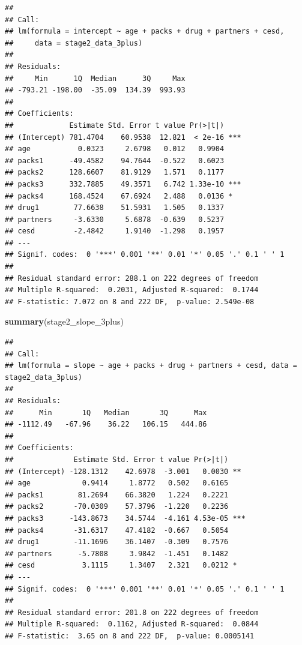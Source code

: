 \documentclass[
]{article}
\newenvironment{Shaded}{\begin{snugshade}}{\end{snugshade}}
\newcommand{\FunctionTok}[1]{\textcolor[rgb]{0.13,0.29,0.53}{\textbf{#1}}}
\newcommand{\NormalTok}[1]{#1}
\begin{document}
\begin{verbatim}
## 
## Call:
## lm(formula = intercept ~ age + packs + drug + partners + cesd, 
##     data = stage2_data_3plus)
## 
## Residuals:
##     Min      1Q  Median      3Q     Max 
## -793.21 -198.00  -35.09  134.39  993.93 
## 
## Coefficients:
##             Estimate Std. Error t value Pr(>|t|)    
## (Intercept) 781.4704    60.9538  12.821  < 2e-16 ***
## age           0.0323     2.6798   0.012   0.9904    
## packs1      -49.4582    94.7644  -0.522   0.6023    
## packs2      128.6607    81.9129   1.571   0.1177    
## packs3      332.7885    49.3571   6.742 1.33e-10 ***
## packs4      168.4524    67.6924   2.488   0.0136 *  
## drug1        77.6638    51.5931   1.505   0.1337    
## partners     -3.6330     5.6878  -0.639   0.5237    
## cesd         -2.4842     1.9140  -1.298   0.1957    
## ---
## Signif. codes:  0 '***' 0.001 '**' 0.01 '*' 0.05 '.' 0.1 ' ' 1
## 
## Residual standard error: 288.1 on 222 degrees of freedom
## Multiple R-squared:  0.2031, Adjusted R-squared:  0.1744 
## F-statistic: 7.072 on 8 and 222 DF,  p-value: 2.549e-08
\end{verbatim}

\begin{Shaded}
\begin{Highlighting}[]
\FunctionTok{summary}\NormalTok{(stage2\_slope\_3plus)}
\end{Highlighting}
\end{Shaded}

\begin{verbatim}
## 
## Call:
## lm(formula = slope ~ age + packs + drug + partners + cesd, data = stage2_data_3plus)
## 
## Residuals:
##      Min       1Q   Median       3Q      Max 
## -1112.49   -67.96    36.22   106.15   444.86 
## 
## Coefficients:
##              Estimate Std. Error t value Pr(>|t|)    
## (Intercept) -128.1312    42.6978  -3.001   0.0030 ** 
## age            0.9414     1.8772   0.502   0.6165    
## packs1        81.2694    66.3820   1.224   0.2221    
## packs2       -70.0309    57.3796  -1.220   0.2236    
## packs3      -143.8673    34.5744  -4.161 4.53e-05 ***
## packs4       -31.6317    47.4182  -0.667   0.5054    
## drug1        -11.1696    36.1407  -0.309   0.7576    
## partners      -5.7808     3.9842  -1.451   0.1482    
## cesd           3.1115     1.3407   2.321   0.0212 *  
## ---
## Signif. codes:  0 '***' 0.001 '**' 0.01 '*' 0.05 '.' 0.1 ' ' 1
## 
## Residual standard error: 201.8 on 222 degrees of freedom
## Multiple R-squared:  0.1162, Adjusted R-squared:  0.0844 
## F-statistic:  3.65 on 8 and 222 DF,  p-value: 0.0005141
\end{verbatim}
\end{document}
